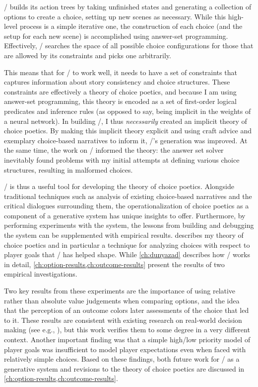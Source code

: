 \dunyazad/ builds its action trees by taking unfinished states and generating a collection of options to create a choice, setting up new scenes as necessary.
%
While this high-level process is a simple iterative one, the construction of each choice (and the setup for each new scene) is accomplished using answer-set programming.
%
Effectively, \dunyazad/ searches the space of all possible choice configurations for those that are allowed by its constraints and picks one arbitrarily.


This means that for \dunyazad/ to work well, it needs to have a set of constraints that captures information about story consistency and choice structures.
%
These constraints are effectively a theory of choice poetics, and because I am using answer-set programming, this theory is encoded as a set of first-order logical predicates and inference rules (as opposed to say, being implicit in the weights of a neural network).
%
In building \dunyazad/, I thus \emph{necessarily} created an implicit theory of choice poetics.
%
By making this implicit theory explicit and using craft advice and exemplary choice-based narratives to inform it, \dunyazad/'s generation was improved.
%
At the same time, the work on \dunyazad/ informed the theory: the answer set solver inevitably found problems with my initial attempts at defining various choice structures, resulting in malformed choices.


\dunyazad/ is thus a useful tool for developing the theory of choice poetics.
%
Alongside traditional techniques such as analysis of existing choice-based narratives and the critical dialogues surrounding them, the operationalization of choice poetics as a component of a generative system has unique insights to offer.
%
Furthermore, by performing experiments with the system, the lessons from building and debugging the system can be supplemented with empirical results.
%
 describes my theory of choice poetics and in particular a technique for analyzing choices with respect to player goals that \dunyazad/ has helped shape.
%
While \cref{ch:dunyazad} describes how \dunyazad/ works in detail, \cref{ch:option-results,ch:outcome-results} present the results of two empirical investigations.


Two key results from these experiments are the importance of using relative rather than absolute value judgements when comparing options, and the idea that the perception of an outcome colors later assessments of the choice that led to it.
%
These results are consistent with existing research on real-world decision making (see e.g., \citep{Mellers1999,Shepperd2002}), but this work verifies them to some degree in a very different context.
%
Another important finding was that a simple high/low priority model of player goals was insufficient to model player expectations even when faced with relatively simple choices.
%
Based on these findings, both future work for \dunyazad/ as a generative system and revisions to the theory of choice poetics are discussed in \cref{ch:option-results,ch:outcome-results}.



